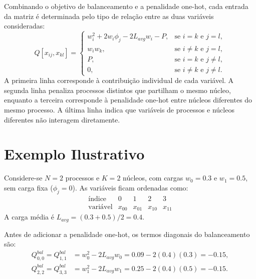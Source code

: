 Combinando o objetivo de balanceamento e a penalidade one-hot, cada entrada da matriz
é determinada pelo tipo de relação entre as duas variáveis consideradas:
\begin{equation}
Q[x_{ij},x_{kl}] =
\begin{cases}
w_i^2 + 2w_i\phi_j - 2L_{avg}w_i - P, & \text{se } i=k \text{ e } j=l,\\
w_iw_k, & \text{se } i \neq k \text{ e } j=l,\\
P, & \text{se } i=k \text{ e } j \neq l,\\
0, & \text{se } i \neq k \text{ e } j \neq l.
\end{cases}
\end{equation}
A primeira linha corresponde à contribuição individual de cada variável. A segunda
linha penaliza processos distintos que partilham o mesmo núcleo, enquanto a terceira
corresponde à penalidade one-hot entre núcleos diferentes do mesmo processo. A última
linha indica que variáveis de processos e núcleos diferentes não interagem diretamente.

\section{Exemplo Ilustrativo}
\label{sec:exemplo-qubo}

Considere-se $N=2$ processos e $K=2$ núcleos, com cargas $w_0=0.3$ e $w_1=0.5$,
sem carga fixa ($\phi_j=0$). As variáveis ficam ordenadas como:
\begin{equation}
\begin{array}{c|cccc}
\text{índice} & 0 & 1 & 2 & 3 \\
\hline
\text{variável} & x_{00} & x_{01} & x_{10} & x_{11}
\end{array}
\end{equation}
A carga média é $L_{avg}=(0.3+0.5)/2=0.4$.

Antes de adicionar a penalidade one-hot, os termos diagonais do balanceamento são:
\begin{equation}
\begin{aligned}
Q_{0,0}^{bal}=Q_{1,1}^{bal}
&= w_0^2 - 2L_{avg}w_0
= 0.09 - 2(0.4)(0.3)
= -0.15,\\
Q_{2,2}^{bal}=Q_{3,3}^{bal}
&= w_1^2 - 2L_{avg}w_1
= 0.25 - 2(0.4)(0.5)
= -0.15.
\end{aligned}
\end{equation}

